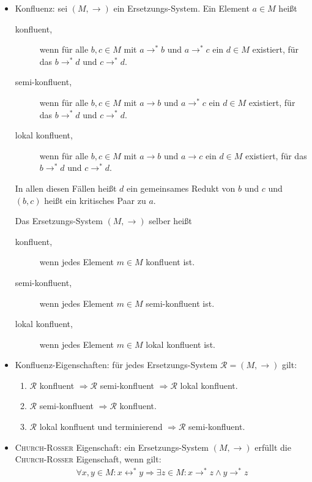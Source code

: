 \documentclass[
  a4paper,
  11pt,
]{scrartcl}
\newcommand{\Rc}{\mathcal{R}}
\begin{document}
\begin{itemize}
  \item Konfluenz: sei $(M, \rightarrow)$ ein Ersetzungs-System. Ein Element $a
    \in M$ heißt
    \begin{description}
      \item[konfluent,] wenn für alle $b, c \in M$ mit $a \rightarrow^* b$ und
        $a \rightarrow^* c$ ein $d \in M$ existiert, für das $b \rightarrow^* d$
        und $c \rightarrow^* d$.
      \item[semi-konfluent,] wenn für alle $b, c \in M$ mit $a \rightarrow b$
        und $a \rightarrow^* c$ ein $d \in M$ existiert, für das $b
        \rightarrow^* d$ und $c \rightarrow^* d$.
      \item[lokal konfluent,] wenn für alle $b, c \in M$ mit $a \rightarrow b$
        und $a \rightarrow c$ ein $d \in M$ existiert, für das $b \rightarrow^*
        d$ und $c \rightarrow^* d$.
    \end{description}
    In allen diesen Fällen heißt $d$ ein gemeinsames Redukt von $b$ und $c$ und
    $(b,c)$ heißt ein kritisches Paar zu $a$.

    Das Ersetzungs-System $(M, \rightarrow)$ selber heißt
    \begin{description}
      \item[konfluent,] wenn jedes Element $m \in M$ konfluent ist.
      \item[semi-konfluent,] wenn jedes Element $m \in M$ semi-konfluent ist.
      \item[lokal konfluent,] wenn jedes Element $m \in M$ lokal konfluent ist.
    \end{description}

  \item Konfluenz-Eigenschaften: für jedes Ersetzungs-System $\Rc = (M,
    \rightarrow)$ gilt:
    \begin{enumerate}
      \item $\Rc$ konfluent $\Rightarrow \Rc$ semi-konfluent
        $\Rightarrow \Rc$ lokal konfluent.
      \item $\Rc$ semi-konfluent $\Rightarrow \Rc$
        konfluent.
      \item $\Rc$ lokal konfluent und terminierend $\Rightarrow
        \Rc$ semi-konfluent.
    \end{enumerate}

  \item \textsc{Church-Rosser} Eigenschaft: ein Ersetzungs-System $(M,
    \rightarrow)$ erfüllt die \textsc{Church-Rosser} Eigenschaft, wenn gilt:
    \begin{align*}
      \forall x, y \in M:
      x \leftrightarrow^* y \Rightarrow
      \exists z \in M:
      x \rightarrow^* z \land y \rightarrow^* z
    \end{align*}


\end{itemize}
\end{document}
